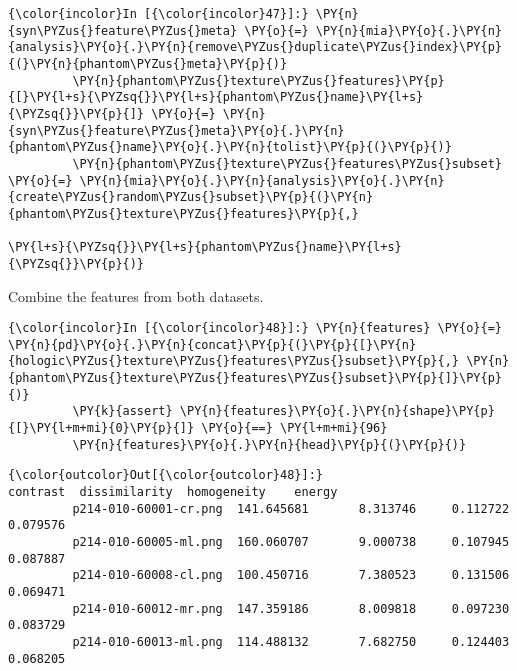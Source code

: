     \begin{Verbatim}[commandchars=\\\{\}]
{\color{incolor}In [{\color{incolor}47}]:} \PY{n}{syn\PYZus{}feature\PYZus{}meta} \PY{o}{=} \PY{n}{mia}\PY{o}{.}\PY{n}{analysis}\PY{o}{.}\PY{n}{remove\PYZus{}duplicate\PYZus{}index}\PY{p}{(}\PY{n}{phantom\PYZus{}meta}\PY{p}{)}
         \PY{n}{phantom\PYZus{}texture\PYZus{}features}\PY{p}{[}\PY{l+s}{\PYZsq{}}\PY{l+s}{phantom\PYZus{}name}\PY{l+s}{\PYZsq{}}\PY{p}{]} \PY{o}{=} \PY{n}{syn\PYZus{}feature\PYZus{}meta}\PY{o}{.}\PY{n}{phantom\PYZus{}name}\PY{o}{.}\PY{n}{tolist}\PY{p}{(}\PY{p}{)}
         \PY{n}{phantom\PYZus{}texture\PYZus{}features\PYZus{}subset} \PY{o}{=} \PY{n}{mia}\PY{o}{.}\PY{n}{analysis}\PY{o}{.}\PY{n}{create\PYZus{}random\PYZus{}subset}\PY{p}{(}\PY{n}{phantom\PYZus{}texture\PYZus{}features}\PY{p}{,}
                                                                             \PY{l+s}{\PYZsq{}}\PY{l+s}{phantom\PYZus{}name}\PY{l+s}{\PYZsq{}}\PY{p}{)}
\end{Verbatim}

    Combine the features from both datasets.

    \begin{Verbatim}[commandchars=\\\{\}]
{\color{incolor}In [{\color{incolor}48}]:} \PY{n}{features} \PY{o}{=} \PY{n}{pd}\PY{o}{.}\PY{n}{concat}\PY{p}{(}\PY{p}{[}\PY{n}{hologic\PYZus{}texture\PYZus{}features\PYZus{}subset}\PY{p}{,} \PY{n}{phantom\PYZus{}texture\PYZus{}features\PYZus{}subset}\PY{p}{]}\PY{p}{)}
         \PY{k}{assert} \PY{n}{features}\PY{o}{.}\PY{n}{shape}\PY{p}{[}\PY{l+m+mi}{0}\PY{p}{]} \PY{o}{==} \PY{l+m+mi}{96}
         \PY{n}{features}\PY{o}{.}\PY{n}{head}\PY{p}{(}\PY{p}{)}
\end{Verbatim}

            \begin{Verbatim}[commandchars=\\\{\}]
{\color{outcolor}Out[{\color{outcolor}48}]:}                          contrast  dissimilarity  homogeneity    energy
         p214-010-60001-cr.png  141.645681       8.313746     0.112722  0.079576
         p214-010-60005-ml.png  160.060707       9.000738     0.107945  0.087887
         p214-010-60008-cl.png  100.450716       7.380523     0.131506  0.069471
         p214-010-60012-mr.png  147.359186       8.009818     0.097230  0.083729
         p214-010-60013-ml.png  114.488132       7.682750     0.124403  0.068205
\end{Verbatim}

